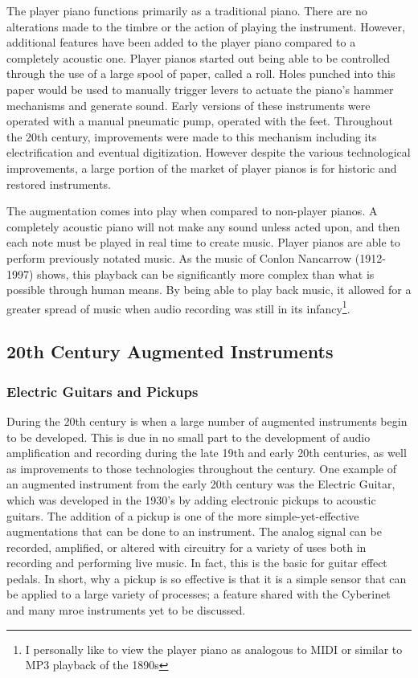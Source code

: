 The player piano functions primarily as a traditional piano. There are no alterations made to the timbre or the action of playing the instrument. However, additional features have been added to the player piano compared to a completely acoustic one. Player pianos started out being able to be controlled through the use of a large spool of paper, called a roll. Holes punched into this paper would be used to manually trigger levers to actuate the piano's hammer mechanisms and generate sound. Early versions of these instruments were operated with a manual pneumatic pump, operated with the feet. Throughout the 20th century, improvements were made to this mechanism including its electrification and eventual digitization. However despite the various technological improvements, a large portion of the market of player pianos is for historic and restored instruments.

The augmentation comes into play when compared to non-player pianos. A completely acoustic piano will not make any sound unless acted upon, and then each note must be played in real time to create music. Player pianos are able to perform previously notated music. As the music of Conlon Nancarrow (1912-1997) shows, this playback can be significantly more complex than what is possible through human means. By being able to play back music, it allowed for a greater spread of music when audio recording was still in its infancy\footnote{I personally like to view the player piano as analogous to MIDI or similar to MP3 playback of the 1890s}. 

\subsection{20th Century Augmented Instruments}

\subsubsection{Electric Guitars and Pickups}
During the 20th century is when a large number of augmented instruments begin to be developed. This is due in no small part to the development of audio amplification and recording during the late 19th and early 20th centuries, as well as improvements to those technologies throughout the century. One example of an augmented instrument from the early 20th century was the Electric Guitar, which was developed in the 1930's by adding electronic pickups to acoustic guitars\cite{electric_guit_history}. The addition of a pickup is one of the more simple-yet-effective augmentations that can be done to an instrument. The analog signal can be recorded, amplified, or altered with circuitry for a variety of uses both in recording and performing live music. In fact, this is the basic for guitar effect pedals. In short, why a pickup is so effective is that it is a simple sensor that can be applied to a large variety of processes; a feature shared with the Cyberinet and many mroe instruments yet to be discussed.

